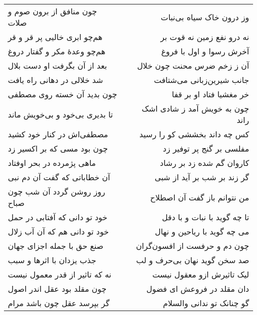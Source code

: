 \begin{center}
\begin{longtable}{l p{0.5cm} r}
چون منافق از برون صوم و صلات
&&
وز درون خاک سیاه بی‌نبات
\\
هم‌چو ابری خالیی پر قر و قر
&&
نه درو نفع زمین نه قوت بر
\\
هم‌چو وعدهٔ مکر و گفتار دروغ
&&
آخرش رسوا و اول با فروغ
\\
بعد از آن بگرفت او دست بلال
&&
آن ز زخم ضرس محنت چون خلال
\\
شد خلالی در دهانی راه یافت
&&
جانب شیرین‌زبانی می‌شتافت
\\
چون بدید آن خسته روی مصطفی
&&
خر مغشیا فتاد او بر قفا
\\
تا بدیری بی‌خود و بی‌خویش ماند
&&
چون به خویش آمد ز شادی اشک راند
\\
مصطفی‌اش در کنار خود کشید
&&
کس چه داند بخششی کو را رسید
\\
چون بود مسی که بر اکسیر زد
&&
مفلسی بر گنج پر توفیر زد
\\
ماهی پژمرده در بحر اوفتاد
&&
کاروان گم شده زد بر رشاد
\\
آن خطاباتی که گفت آن دم نبی
&&
گر زند بر شب بر آید از شبی
\\
روز روشن گردد آن شب چون صباح
&&
من نتوانم باز گفت آن اصطلاح
\\
خود تو دانی که آفتابی در حمل
&&
تا چه گوید با نبات و با دقل
\\
خود تو دانی هم که آن آب زلال
&&
می چه گوید با ریاحین و نهال
\\
صنع حق با جمله اجزای جهان
&&
چون دم و حرفست از افسون‌گران
\\
جذب یزدان با اثرها و سبب
&&
صد سخن گوید نهان بی‌حرف و لب
\\
نه که تاثیر از قدر معمول نیست
&&
لیک تاثیرش ازو معقول نیست
\\
چون مقلد بود عقل اندر اصول
&&
دان مقلد در فروعش ای فضول
\\
گر بپرسد عقل چون باشد مرام
&&
گو چنانک تو ندانی والسلام
\\
\end{longtable}
\end{center}
